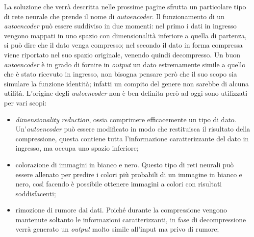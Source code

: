 %
%
%
%

La soluzione che verrà descritta nelle prossime pagine sfrutta un particolare tipo di rete neurale che prende il nome di \textit{autoencoder}.
Il funzionamento di un \textit{autoencoder} può essere suddiviso in due momenti:
nel primo i dati in ingresso vengono mappati in uno spazio con dimensionalità inferiore a quella di partenza, si può dire che il dato venga compresso;
nel secondo il dato in forma compressa viene riportato nel suo spazio originale, venendo quindi decompresso.
Un buon \textit{autoencoder} è in grado di fornire in \textit{output} un dato estremamente simile a quello che è stato ricevuto in ingresso, non bisogna pensare però che il suo scopo sia simulare la funzione identità; infatti un compito del genere non sarebbe di alcuna utilità.
L'origine degli \textit{autoencoder} non è ben definita però ad oggi sono utilizzati per vari scopi:
\begin{itemize}
  \item \textit{dimensionality reduction}, ossia comprimere efficacemente un tipo di dato.
    Un'\textit{autoencoder} può essere modificato in modo che restituisca il risultato della compressione, questa contiene tutta l'informazione caratterizzante del dato in ingresso, ma occupa uno spazio inferiore;

  \item colorazione di immagini in bianco e nero.
    Questo tipo di reti neurali può essere allenato per predire i colori più probabili di un immagine in bianco e nero, così facendo è possibile ottenere immagini a colori con risultati soddisfacenti;

  \item rimozione di rumore dai dati.
    Poiché durante la compressione vengono mantenute soltanto le informazioni caratterizzanti, in fase di decompressione verrà generato un \textit{output} molto simile all'input ma privo di rumore;


\end{itemize}

